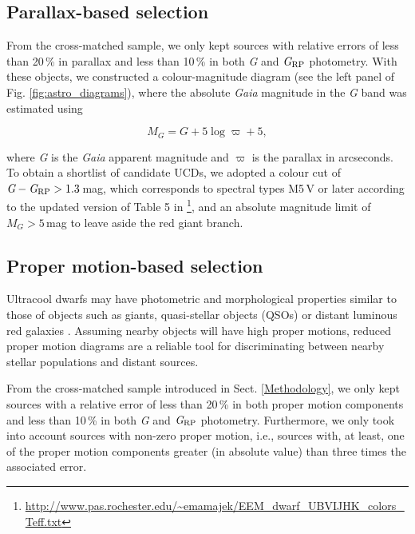 \subsection{Parallax-based selection} \label{parallax}

From the cross-matched sample, we only kept sources with relative errors of less than 20\,\% in parallax and less than 10\,\% in both \textit{G} and $\textit{G}_{\rm RP}$ photometry. With these objects, we constructed a colour-magnitude diagram (see the left panel of Fig. \ref{fig:astro_diagrams}), where the absolute \textit{Gaia} magnitude in the \textit{G} band was estimated using

\begin{equation}
    M_G= \textit{G} + 5\log{\varpi} + 5,
	\label{eq:absoluteg}
\end{equation}

\noindent where \textit{G} is the \textit{Gaia} apparent magnitude and $\varpi$ is the parallax in arcseconds. To obtain a shortlist of candidate UCDs, we adopted a colour cut of $\textit{G} - \textit{G}_{\rm RP} > 1.3$\,mag, which corresponds to spectral types M5\,V or later according to the updated version of Table 5 in \citet{pecaut2013} \footnote{\label{mamajek}\url{http://www.pas.rochester.edu/~emamajek/EEM_dwarf_UBVIJHK_colors_Teff.txt}}, and an absolute magnitude limit of $M_G > 5$\,mag to leave aside the red giant branch.


\subsection{Proper motion-based selection} \label{pm}

Ultracool dwarfs may have photometric and morphological properties similar to those of objects such as giants, quasi-stellar objects (QSOs) or distant luminous red galaxies \citep[e.g.][]{Caballero2018, theissen2016, theyssen2017}. Assuming nearby objects will have high proper motions, reduced proper motion diagrams are a reliable tool for discriminating between nearby stellar populations and distant sources.

From the cross-matched sample introduced in Sect. \ref{Methodology}, we only kept sources with a relative error of less than 20\,\% in both proper motion components and less than 10\,\% in both \textit{G} and $\textit{G}_{\rm RP}$ photometry. Furthermore, we only took into account sources with non-zero proper motion, i.e., sources with, at least, one of the proper motion components greater (in absolute value) than three times the associated error.

